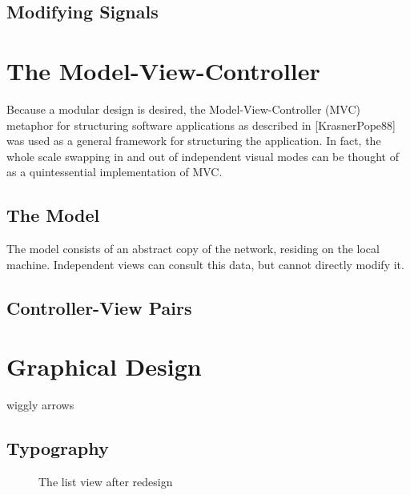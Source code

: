 \subsection{Modifying Signals}

\section{The Model-View-Controller}
\label{sec:MVC}

	Because a modular design is desired, the Model-View-Controller (MVC) metaphor for structuring software applications as described in [KrasnerPope88] was used as a general framework for structuring the application. In fact, the whole scale swapping in and out of independent visual modes can be thought of as a quintessential implementation of MVC. 
	
\subsection{The Model}

	The model consists of an abstract copy of the network, residing on the local machine. Independent views can consult this data, but cannot directly modify it.

\subsection{Controller-View Pairs}

\section{Graphical Design}
	wiggly arrows
\subsection{Typography}

\begin{figure}[ht]
\centering
\caption{The list view after redesign}
\label{fig:final_list}
\end{figure}

